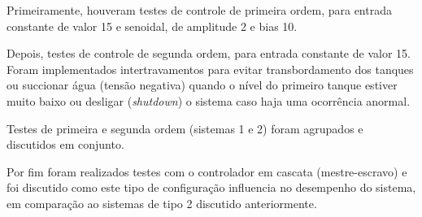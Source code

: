 

Primeiramente, houveram testes de controle de primeira ordem, para entrada constante de valor 15 e senoidal, de amplitude 2 e bias 10.

Depois, testes de controle de segunda ordem, para entrada constante de valor 15. Foram implementados intertravamentos para evitar transbordamento dos tanques ou succionar água (tensão negativa) quando o nível do primeiro tanque estiver muito baixo ou desligar (\emph{shutdown}) o sistema caso haja uma ocorrência anormal.

Testes de primeira e segunda ordem (sistemas 1 e 2) foram agrupados e discutidos em conjunto.

Por fim foram realizados testes com o controlador em cascata (mestre-escravo) e foi discutido como este tipo de configuração influencia no desempenho do sistema, em comparação ao sistemas de tipo 2 discutido anteriormente.


% 
% 
% 

% 
% 
% 
% 

% 
% 
\newpage
%
% 

\newpage
%
% 

\newpage
%
% 

\newpage
%
% 
